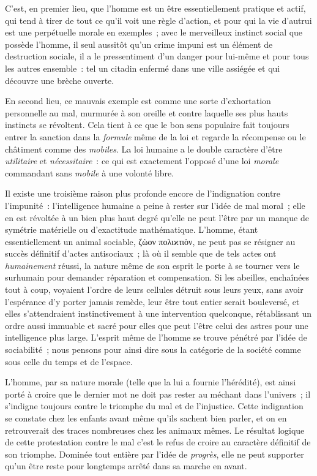 \documentclass[french,twoside]{book} %
\begin{document}
C’est, en premier lieu, que l’homme est un être essentiellement pratique et actif, qui tend à tirer de tout ce qu’il voit une règle d’action, et pour qui la vie d’autrui est une perpétuelle morale en exemples ; avec le merveilleux instinct social que possède l’homme, il seul aussitôt qu’un crime impuni est un élément de destruction sociale, il a le pressentiment d’un danger pour lui-même et pour tous les autres ensemble : tel un citadin enfermé dans une ville assiégée et qui découvre une brèche ouverte.\par
En second lieu, ce mauvais exemple est comme une sorte d’exhortation personnelle au mal, murmurée à son oreille et contre laquelle ses plus hauts instincts se révoltent. Cela tient à ce que le bon sens populaire fait toujours entrer la sanction dans la \emph{formule} même de la loi et regarde la récompense ou le châtiment comme des \emph{mobiles}. La loi humaine a le double caractère d’être \emph{utilitaire} et \emph{nécessitaire} : ce qui est exactement l’opposé d’une loi \emph{morale} commandant sans \emph{mobile} à une volonté libre.\par
Il existe une troisième raison plus profonde encore de l’indignation contre l’impunité : l’intelligence humaine a peine à rester sur l’idée de mal moral ; elle en est révoltée à un bien plus haut degré qu’elle ne peut l’être par un manque de symétrie matérielle ou d’exactitude mathématique. L’homme, étant essentiellement un animal sociable, ζὼον πολιϰτιὸν, ne peut pas se résigner au succès définitif d’actes antisociaux ; là où il semble que de tels actes ont \emph{humainement} réussi, la nature même de son esprit le porte à se tourner vers le surhumain pour demander réparation et compensation. Si les abeilles, enchaînées tout à coup, voyaient l’ordre de leurs cellules détruit sous leurs yeux, sans avoir l’espérance d’y porter jamais remède, leur être tout entier serait bouleversé, et elles s’attendraient instinctivement à une intervention quelconque, rétablissant un ordre aussi immuable et sacré pour elles que peut l’être celui des astres pour une intelligence plus large. L’esprit même de l’homme se trouve pénétré par l’idée de sociabilité ; nous pensons pour ainsi dire sous la catégorie de la société comme sous celle du temps et de l’espace.\par
L’homme, par sa nature morale (telle que la lui a fournie l’hérédité), est ainsi porté à croire que le dernier mot ne doit pas rester au méchant dans l’univers ; il s’indigne toujours contre le triomphe du mal et de l’injustice. Cette indignation se constate chez les enfants avant même qu’ils sachent bien parler, et on en retrouverait des traces nombreuses chez les animaux mêmes. Le résultat logique de cette protestation contre le mal c’est le refus de croire au caractère définitif de son triomphe. Dominée tout entière par l’idée de \emph{progrès}, elle ne peut supporter qu’un être reste pour longtemps arrêté dans sa marche en avant.\par
\end{document}
